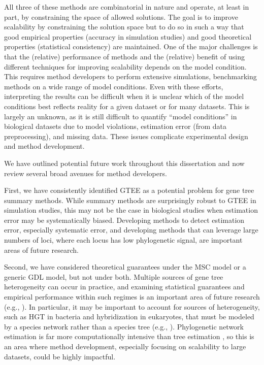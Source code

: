 All three of these methods are combinatorial in nature and operate, at least in part, by constraining the space of allowed solutions.
The goal is to improve scalability by constraining the solution space but to do so in such a way that good empirical properties (accuracy in simulation studies) and good theoretical properties (statistical consistency) are maintained.
One of the major challenges is that the (relative) performance of methods and the (relative) benefit of using different techniques for improving scalability depends on the model condition.
This requires method developers to perform extensive simulations, benchmarking methods on a wide range of model conditions.
Even with these efforts, interpreting the results can be difficult when it is unclear which of the model conditions best reflects reality for a given dataset or for many datasets.
This is largely an unknown, as it is still difficult to quantify ``model conditions'' in biological datasets due to model violations, estimation error (from data preprocessing), and missing data.
These issues complicate experimental design and method development.

We have outlined potential future work throughout this dissertation and now review several broad avenues for method developers.

First, we have consistently identified \gls{GTEE} as a potential problem for gene tree summary methods.
While summary methods are surprisingly robust to GTEE in simulation studies, this may not be the case in biological studies when estimation error may be systematically biased.
Developing methods to detect estimation error, especially systematic error, and developing methods that can leverage large numbers of loci, where each locus has low phylogenetic signal, are important areas of future research.

Second, we have considered theoretical guarantees under the MSC model or a generic GDL model, but not under both. 
Multiple sources of gene tree heterogeneity can occur in practice, and examining statistical guarantees and empirical performance within such regimes is an important area of future research (e.g., \cite{markin2020quartet}). 
In particular, it may be important to account for sources of heterogeneity, such as \gls{HGT} in bacteria and hybridization in eukaryotes, that must be modeled by a species network rather than a species tree (e.g., \cite{du2019unifying}). 
Phylogenetic network estimation is far more computationally intensive than tree estimation \cite{nakhleh2011evolutionary}, so this is an area where method development, especially focusing on scalability to large datasets, could be highly impactful.

